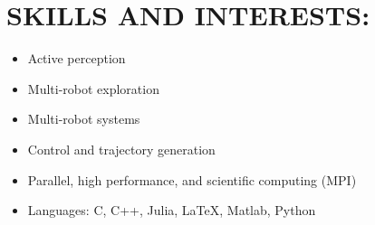 \section{SKILLS AND INTERESTS:}
\begin{itemize}
  \item Active perception
  \item Multi-robot exploration
  \item Multi-robot systems
  \item Control and trajectory generation
  \item Parallel, high performance, and scientific computing (MPI)
  \item Languages: C, C++, Julia, \LaTeX, Matlab, Python
\end{itemize}
